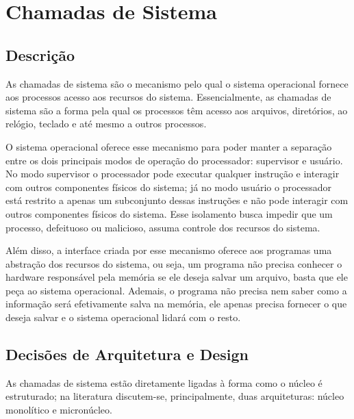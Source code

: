 \chapter{Chamadas de Sistema}
\section{Descrição}

As chamadas de sistema são o mecanismo pelo qual o sistema operacional fornece aos processos acesso aos recursos do sistema. Essencialmente, as chamadas de sistema são a forma pela qual os processos têm acesso aos arquivos, diretórios, ao relógio, teclado e até mesmo a outros processos.

O sistema operacional oferece esse mecanismo para poder manter a separação entre os dois principais modos de operação do processador: supervisor e usuário. No modo supervisor o processador pode executar qualquer instrução e interagir com outros componentes físicos do sistema; já no modo usuário o processador está restrito a apenas um subconjunto dessas instruções e não pode interagir com outros componentes físicos do sistema. Esse isolamento busca impedir que um processo, defeituoso ou malicioso, assuma controle dos recursos do sistema.

Além disso, a interface criada por esse mecanismo oferece aos programas uma abstração dos recursos do sistema, ou seja, um programa não precisa conhecer o hardware responsável pela memória se ele deseja salvar um arquivo, basta que ele peça ao sistema operacional. Ademais, o programa não precisa nem saber como a informação será efetivamente salva na memória, ele apenas precisa fornecer o que deseja salvar e o sistema operacional lidará com o resto.

\section{Decisões de Arquitetura e Design}

As chamadas de sistema estão diretamente ligadas à forma como o núcleo é estruturado; na literatura discutem-se, principalmente, duas arquiteturas: núcleo monolítico e micronúcleo.

